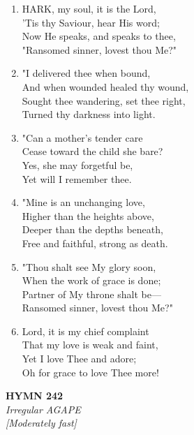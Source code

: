 \documentclass[11pt,a4paper]{article}
\begin{document}
\begin{enumerate}
    \item HARK, my soul, it is the Lord, \\
        'Tis thy Saviour, hear His word; \\
        Now He speaks, and speaks to thee, \\
        "Ransomed sinner, lovest thou Me?"

    \item "I delivered thee when bound, \\
        And when wounded healed thy wound, \\
        Sought thee wandering, set thee right, \\
        Turned thy darkness into light.

    \item "Can a mother's tender care \\
        Cease toward the child she bare? \\
        Yes, she may forgetful be, \\
        Yet will I remember thee.

    \item "Mine is an unchanging love, \\
        Higher than the heights above, \\
        Deeper than the depths beneath, \\
        Free and faithful, strong as death.

    \item "Thou shalt see My glory soon, \\
        When the work of grace is done; \\
        Partner of My throne shalt be--- \\
        Ransomed sinner, lovest thou Me?"

    \item Lord, it is my chief complaint \\
        That my love is weak and faint, \\
        Yet I love Thee and adore; \\
        Oh for grace to love Thee more!

\end{enumerate}

\newpage
\begin{center}
    {\Large \textbf{HYMN 242}}
    \\
    \textit{Irregular AGAPE}
    \\
    \textit{\small [Moderately fast]}
\end{center}
\vspace{1em}
\end{document}
